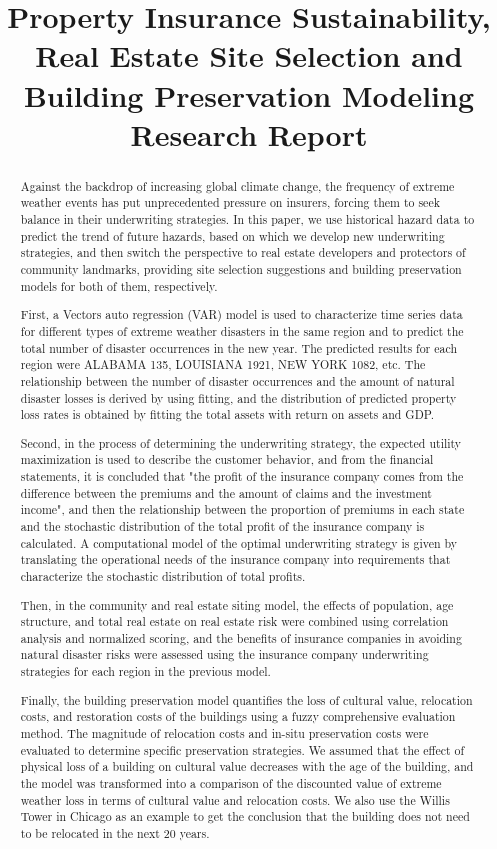 \documentclass[12pt]{article}  %
\title{Property Insurance Sustainability, Real Estate Site Selection and Building Preservation Modeling Research Report}  %
\begin{document}
\begin{abstract}
Against the backdrop of increasing global climate change, the frequency of extreme weather events has put unprecedented pressure on insurers, forcing them to seek balance in their underwriting strategies. In this paper, we use historical hazard data to predict the trend of future hazards, based on which we develop new underwriting strategies, and then switch the perspective to real estate developers and protectors of community landmarks, providing site selection suggestions and building preservation models for both of them, respectively.

First, a Vectors auto regression (VAR) model is used to characterize time series data for different types of extreme weather disasters in the same region and to predict the total number of disaster occurrences in the new year. The predicted results for each region were ALABAMA 135, LOUISIANA 1921, NEW YORK 1082, etc. The relationship between the number of disaster occurrences and the amount of natural disaster losses is derived by using fitting, and the distribution of predicted property loss rates is obtained by fitting the total assets with return on assets and GDP.

Second, in the process of determining the underwriting strategy, the expected utility maximization is used to describe the customer behavior, and from the financial statements, it is concluded that "the profit of the insurance company comes from the difference between the premiums and the amount of claims and the investment income", and then the relationship between the proportion of premiums in each state and the stochastic distribution of the total profit of the insurance company is calculated. A computational model of the optimal underwriting strategy is given by translating the operational needs of the insurance company into requirements that characterize the stochastic distribution of total profits.

Then, in the community and real estate siting model, the effects of population, age structure, and total real estate on real estate risk were combined using correlation analysis and normalized scoring, and the benefits of insurance companies in avoiding natural disaster risks were assessed using the insurance company underwriting strategies for each region in the previous model.

Finally, the building preservation model quantifies the loss of cultural value, relocation costs, and restoration costs of the buildings using a fuzzy comprehensive evaluation method. The magnitude of relocation costs and in-situ preservation costs were evaluated to determine specific preservation strategies. We assumed that the effect of physical loss of a building on cultural value decreases with the age of the building, and the model was transformed into a comparison of the discounted value of extreme weather loss in terms of cultural value and relocation costs. We also use the Willis Tower in Chicago as an example to get the conclusion that the building does not need to be relocated in the next 20 years.


\end{abstract}
\end{document}
